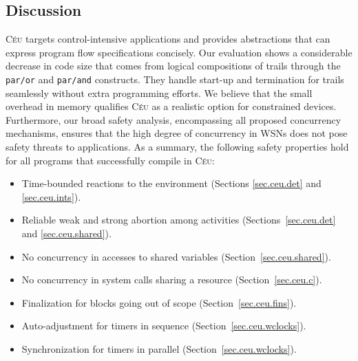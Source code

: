 \documentclass[letterpaper]{sig-alternate}
\newcommand{\code}[1] {{\small{\texttt{#1}}}}
\newcommand{\CEU}{\textsc{C\'{e}u}\xspace}
\begin{document}
\subsection{Discussion}

\CEU targets control-intensive applications and provides abstractions that can 
express program flow specifications concisely.
%
Our evaluation shows a considerable decrease in code size that comes from 
logical compositions of trails through the \code{par/or} and \code{par/and} 
constructs.
%
They handle start-up and termination for trails seamlessly without extra 
programming efforts.
%
We believe that the small overhead in memory qualifies \CEU as a realistic 
option for constrained devices.
%
%
%
%
%
Furthermore, our broad safety analysis, encompassing all proposed concurrency 
mechanisms, ensures that the high degree of concurrency in WSNs does not pose 
safety threats to applications.
%
%
%
As a summary, the following safety properties hold for all programs that 
successfully compile in \CEU:

\begin{itemize}
\item Time-bounded reactions to the environment
        (Sections \ref{sec.ceu.det} and \ref{sec.ceu.ints}).
\item Reliable weak and strong abortion among activities
        (Sections~\ref{sec.ceu.det} and \ref{sec.ceu.shared}).
\item No concurrency in accesses to shared variables
(Section~\ref{sec.ceu.shared}).
\item No concurrency in system calls sharing a resource
        (Section~\ref{sec.ceu.c}).
\item Finalization for blocks going out of scope
        (Section~\ref{sec.ceu.fins}).
\item Auto-adjustment for timers in sequence
        (Section~\ref{sec.ceu.wclocks}).
\item Synchronization for timers in parallel
        (Section~\ref{sec.ceu.wclocks}).
\end{itemize}
\end{document}
